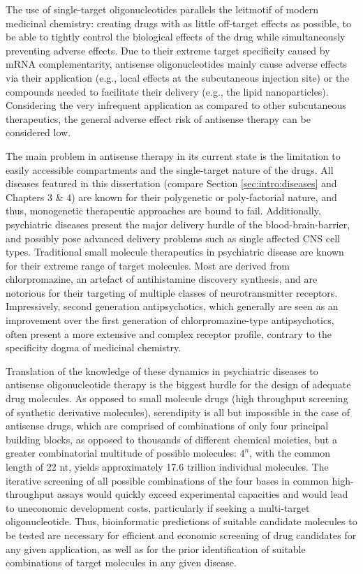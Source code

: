 The use of single-target oligonucleotides parallels the leitmotif of modern medicinal chemistry: creating drugs with as little off-target effects as possible, to be able to tightly control the biological effects of the drug while simultaneously preventing adverse effects. Due to their extreme target specificity caused by mRNA complementarity, antisense oligonucleotides mainly cause adverse effects via their application (e.g., local effects at the subcutaneous injection site) or the compounds needed to facilitate their delivery (e.g., the lipid nanoparticles). Considering the very infrequent application as compared to other subcutaneous therapeutics, the general adverse effect risk of antisense therapy can be considered low.\cite{Raal2020}

The main problem in antisense therapy in its current state is the limitation to easily accessible compartments and the single-target nature of the drugs. All diseases featured in this dissertation (compare Section \ref{sec:intro:diseases} and Chapters 3 \& 4) are known for their polygenetic or poly-factorial nature, and thus, monogenetic therapeutic approaches are bound to fail. Additionally, psychiatric diseases present the major delivery hurdle of the blood-brain-barrier, and possibly pose advanced delivery problems such as single affected CNS cell types. Traditional small molecule therapeutics in psychiatric disease are known for their extreme range of target molecules. Most are derived from chlorpromazine, an artefact of antihistamine discovery synthesis, and are notorious for their targeting of multiple classes of neurotransmitter receptors. Impressively, second generation antipsychotics, which generally are seen as an improvement over the first generation of chlorpromazine-type antipsychotics, often present a more extensive and complex receptor profile, contrary to the specificity dogma of medicinal chemistry.

Translation of the knowledge of these dynamics in psychiatric diseases to antisense oligonucleotide therapy is the biggest hurdle for the design of adequate drug molecules. As opposed to small molecule drugs (high throughput screening of synthetic derivative molecules), serendipity is all but impossible in the case of antisense drugs, which are comprised of combinations of only four principal building blocks, as opposed to thousands of different chemical moieties, but a greater combinatorial multitude of possible molecules: $4^n$, with the common length of 22 nt, yields approximately 17.6 trillion individual molecules. The iterative screening of all possible combinations of the four bases in common high-throughput assays would quickly exceed experimental capacities and would lead to uneconomic development costs, particularly if seeking a multi-target oligonucleotide. Thus, bioinformatic predictions of suitable candidate molecules to be tested are necessary for efficient and economic screening of drug candidates for any given application, as well as for the prior identification of suitable combinations of target molecules in any given disease.


